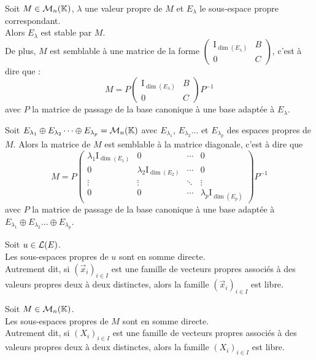 \documentclass[a4paper]{book}
\begin{document}
\begin{Proposition}
Soit $M\in \mathcal{M}_{n}(\mathbb{K})$, $\lambda    $ une valeur propre de $M$ et $E_\lambda    $ le sous-espace propre correspondant.\\
Alors $E_\lambda    $ est stable par $M$.\\
De plus, $M$ est semblable à une matrice de la forme $\begin{pmatrix}
\mathrm{I}_{\dim(E_\lambda)} & B \\ 0 & C
\end{pmatrix}$, c'est à dire que :
$$M = P \begin{pmatrix}
\mathrm{I}_{\dim(E_\lambda)} & B \\ 0 & C
\end{pmatrix} P^{-1}  $$
avec $P$ la matrice de passage de la base canonique à une base adaptée à $E_\lambda$.  
\end{Proposition}
\begin{Proposition}[Diagonalisation] Soit $E_{\lambda_1}\oplus E_{\lambda_2}\dots \oplus E_{\lambda_p}  =\mathcal{M}_{n}(\mathbb{K})$ avec $E_{\lambda_1}$, $E_{\lambda_2}\dots$ et $E_{\lambda_p}$  des espaces propres de $M$. Alors la matrice de $M$ est semblable à la matrice diagonale, c'est à dire que 
$$M=P \begin{pmatrix}\lambda_1 \mathrm {I}_{\dim(E_1)}&\mathrm {0}&\cdots &\mathrm {0}\\\mathrm {0}&\lambda_2 \mathrm {I}_{\dim(E_2)}&\cdots &\mathrm {0}\\\vdots &\vdots &\ddots &\vdots \\\mathrm {0}&\mathrm {0}&\cdots &\lambda_p \mathrm {I}_{\dim(E_p)}\end{pmatrix} P^{-1}$$ avec $P$ la matrice de passage de la base canonique à une base adaptée à $E_{\lambda_1}\oplus E_{\lambda_2}\dots \oplus E_{\lambda_p}$.
\end{Proposition}
\begin{Theoreme}
Soit $u\in \mathcal{L}(E)$.\\
Les sous-espaces propres de $u$ sont en somme directe.\\
Autrement dit, si $(\vec{x}_i)_{i\in I}$ est une famille de vecteurs propres
associés à des valeurs propres deux à deux distinctes,
alors la famille $(\vec{x}_i)_{i\in I}$ est libre.
\end{Theoreme}
\begin{Theoreme}
Soit $M\in \mathcal{M}_{n}(\mathbb{K})$.\\
Les sous-espaces propres de $M$ sont en somme directe.\\
Autrement dit, si $(X_i)_{i\in I}$ est une famille de vecteurs propres
associés à des valeurs propres deux à deux distinctes,
alors la famille $(X_i)_{i\in I}$ est libre.
\end{Theoreme}
%
\end{document}
